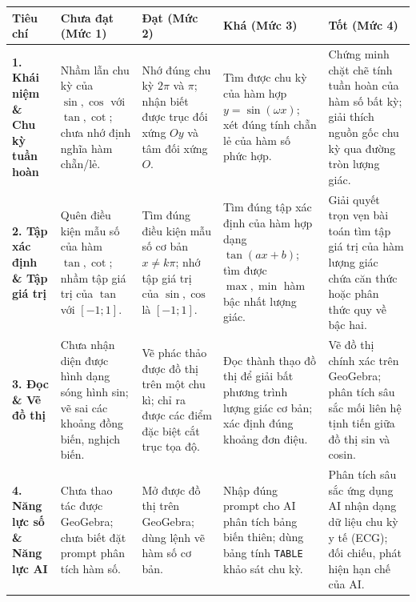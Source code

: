 \documentclass[12pt, a4paper]{article}
\begin{document}
\begin{table}[h!]
\centering
\small
\begin{tabularx}{\textwidth}{|p{2.8cm}|X|X|X|X|}
\hline
\textbf{Tiêu chí} & \textbf{Chưa đạt (Mức 1)} & \textbf{Đạt (Mức 2)} & \textbf{Khá (Mức 3)} & \textbf{Tốt (Mức 4)} \\
\hline
\textbf{1. Khái niệm \& Chu kỳ tuần hoàn} & Nhầm lẫn chu kỳ của $\sin, \cos$ với $\tan, \cot$; chưa nhớ định nghĩa hàm chẵn/lẻ. & Nhớ đúng chu kỳ $2\pi$ và $\pi$; nhận biết được trục đối xứng $Oy$ và tâm đối xứng $O$. & Tìm được chu kỳ của hàm hợp $y = \sin(\omega x)$; xét đúng tính chẵn lẻ của hàm số phức hợp. & Chứng minh chặt chẽ tính tuần hoàn của hàm số bất kỳ; giải thích nguồn gốc chu kỳ qua đường tròn lượng giác. \\
\hline
\textbf{2. Tập xác định \& Tập giá trị} & Quên điều kiện mẫu số của hàm $\tan, \cot$; nhầm tập giá trị của $\tan$ với $[-1; 1]$. & Tìm đúng điều kiện mẫu số cơ bản $x \neq k\pi$; nhớ tập giá trị của $\sin, \cos$ là $[-1; 1]$. & Tìm đúng tập xác định của hàm hợp dạng $\tan(ax + b)$; tìm được $\max, \min$ hàm bậc nhất lượng giác. & Giải quyết trọn vẹn bài toán tìm tập giá trị của hàm lượng giác chứa căn thức hoặc phân thức quy về bậc hai. \\
\hline
\textbf{3. Đọc \& Vẽ đồ thị} & Chưa nhận diện được hình dạng sóng hình sin; vẽ sai các khoảng đồng biến, nghịch biến. & Vẽ phác thảo được đồ thị trên một chu kì; chỉ ra được các điểm đặc biệt cắt trục tọa độ. & Đọc thành thạo đồ thị để giải bất phương trình lượng giác cơ bản; xác định đúng khoảng đơn điệu. & Vẽ đồ thị chính xác trên GeoGebra; phân tích sâu sắc mối liên hệ tịnh tiến giữa đồ thị sin và cosin. \\
\hline
\textbf{4. Năng lực số \& Năng lực AI} & Chưa thao tác được GeoGebra; chưa biết đặt prompt phân tích hàm số. & Mở được đồ thị trên GeoGebra; dùng lệnh vẽ hàm số cơ bản. & Nhập đúng prompt cho AI phân tích bảng biến thiên; dùng bảng tính \texttt{TABLE} khảo sát chu kỳ. & Phân tích sâu sắc ứng dụng AI nhận dạng dữ liệu chu kỳ y tế (ECG); đối chiếu, phát hiện hạn chế của AI. \\
\hline
\end{tabularx}
\end{table}
\end{document}
